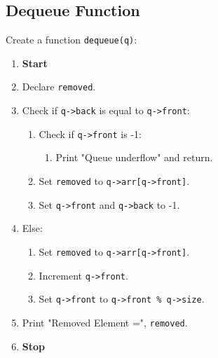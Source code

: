 {  \subsection{Dequeue Function}
  Create a function \texttt{dequeue(q)}:
  \begin{enumerate}[label=\arabic*:,left=0pt]
    \item \textbf{Start}
    \item Declare \texttt{removed}.
    \item Check if \texttt{q->back} is equal to \texttt{q->front}:
          \begin{enumerate}[label=2.\arabic*.]
            \item Check if \texttt{q->front} is -1:
                  \begin{enumerate}[label=3.\arabic*.]
                    \item Print "Queue underflow" and return.
                  \end{enumerate}
            \item Set \texttt{removed} to \texttt{q->arr[q->front]}.
            \item Set \texttt{q->front} and \texttt{q->back} to -1.
          \end{enumerate}
    \item Else:
          \begin{enumerate}[label=2.\arabic*.]
            \item Set \texttt{removed} to \texttt{q->arr[q->front]}.
            \item Increment \texttt{q->front}.
            \item Set \texttt{q->front} to \texttt{q->front \% q->size}.
          \end{enumerate}
    \item Print "Removed Element =", \texttt{removed}.
    \item \textbf{Stop}
  \end{enumerate}

}
